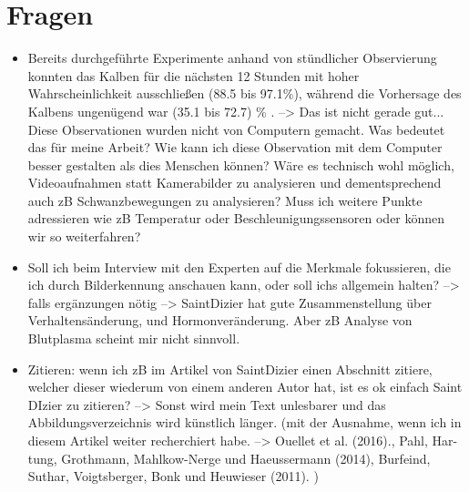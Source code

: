 

\chapter{Fragen}

\begin{itemize}
	\item Bereits durchgeführte Experimente anhand von stündlicher Observierung konnten das Kalben für die nächsten 12 Stunden mit hoher Wahrscheinlichkeit ausschließen (88.5 bis 97.1\%), während die Vorhersage des Kalbens ungenügend war (35.1 bis 72.7) \%  \citep{Lange2017}. --> Das ist nicht gerade gut... Diese Observationen wurden nicht von Computern gemacht. Was bedeutet das für meine Arbeit? Wie kann ich diese Observation mit dem Computer besser gestalten als dies Menschen können? Wäre es technisch wohl möglich, Videoaufnahmen statt Kamerabilder zu analysieren und dementsprechend auch zB Schwanzbewegungen zu analysieren? Muss ich weitere Punkte adressieren wie zB Temperatur oder Beschleunigungssensoren oder können wir so weiterfahren?
	\item Soll ich beim Interview mit den Experten auf die Merkmale fokussieren, die ich durch Bilderkennung anschauen kann, oder soll ichs allgemein halten? --> falls ergänzungen nötig --> SaintDizier hat gute Zusammenstellung über Verhaltensänderung, und Hormonveränderung. Aber zB Analyse von Blutplasma scheint mir nicht sinnvoll.
	\item Zitieren: wenn ich zB im Artikel von SaintDizier einen Abschnitt zitiere, welcher dieser wiederum von einem anderen Autor hat, ist es ok einfach Saint DIzier zu zitieren? --> Sonst wird mein Text unlesbarer und das Abbildungsverzeichnis wird künstlich länger. (mit der Ausnahme, wenn ich in diesem Artikel weiter recherchiert habe. --> Ouellet et al. (2016).,  Pahl, Har- tung, Grothmann, Mahlkow-Nerge und Haeussermann (2014),  Burfeind, Suthar, Voigtsberger, Bonk und Heuwieser (2011). )
\end{itemize}

